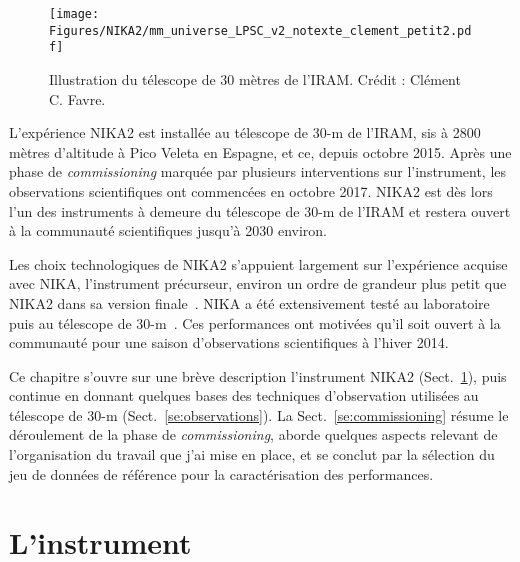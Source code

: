
\begin{figure}[ht!] 
\begin{center}
\texttt{[image: Figures/NIKA2/mm\_universe\_LPSC\_v2\_notexte\_clement\_petit2.pdf]}
\caption[Illustration du télescope de 30 mètres de
  l'IRAM]{Illustration du télescope de 30 mètres de l'IRAM. Crédit :
  Clément C. Favre.} 
 \label{fig:affiche}
\end{center}
\end{figure}


L'expérience NIKA2 est installée au télescope de 30-m de l'IRAM, sis à
2800 mètres d'altitude à Pico Veleta en Espagne, et ce, depuis
octobre 2015. Après une phase de \emph{commissioning} marquée par
plusieurs interventions sur l'instrument, les observations
scientifiques ont commencées en octobre 2017. NIKA2 est dès lors l'un
des instruments à demeure du télescope de 30-m de l'IRAM et restera
ouvert à la communauté scientifiques jusqu'à 2030 environ.

Les choix technologiques de NIKA2 s'appuient largement sur
l'expérience acquise avec NIKA, l'instrument précurseur, environ un
ordre de grandeur plus petit que NIKA2 dans sa version
finale~\citep{Monfardini2014JLTP}. NIKA a été extensivement testé
au laboratoire puis au télescope de 30-m~\citep{Catalano2014}. Ces
performances ont motivées qu'il soit ouvert à la communauté pour une
saison d'observations scientifiques à l'hiver 2014.

Ce chapitre s'ouvre sur une brève description l'instrument NIKA2
(Sect.~\ref{se:instrument}), puis continue en donnant quelques bases
des techniques d'observation utilisées au télescope de 30-m
(Sect.~\ref{se:observations}). La Sect.~\ref{se:commissioning} résume
le déroulement de la phase de \emph{commissioning}, aborde quelques
aspects relevant de l'organisation du travail que j'ai mise en place,
et se conclut par la sélection du jeu de données de référence pour la
caractérisation des performances.



\section{L'instrument}
\label{se:instrument}

